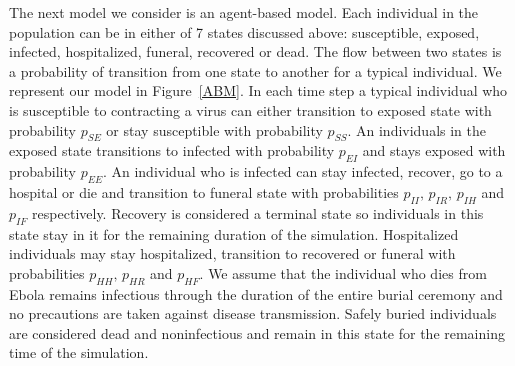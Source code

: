 The next model we consider is an agent-based model. Each individual in the population can be in either of 7 states discussed above: susceptible, exposed, infected, hospitalized, funeral, recovered or dead. The flow between two states is a  probability of transition from one state to another for a typical individual. We represent our model in Figure~\ref{ABM}. In each time step a typical individual who is susceptible to contracting a virus can either transition to exposed state with probability $p_{SE}$ or stay susceptible with probability $p_{SS}$. An individuals in the exposed state transitions to infected with probability $p_{EI}$ and stays exposed with probability $p_{EE}$. An individual who is infected can stay infected, recover, go to a hospital or die and transition to funeral state with probabilities $p_{II},\, p_{IR},\, p_{IH}$ and $p_{IF}$ respectively. Recovery is considered a terminal state so individuals in this state stay in it for the remaining duration of the simulation. Hospitalized individuals may stay hospitalized, transition to recovered or funeral with probabilities $p_{HH}, \, p_{HR}$ and $p_{HF}$. We assume that the individual who dies from Ebola remains infectious through the duration of the entire burial ceremony and no precautions are taken against disease transmission. Safely buried individuals are considered dead and noninfectious and remain in this state for the remaining time of the simulation.  


